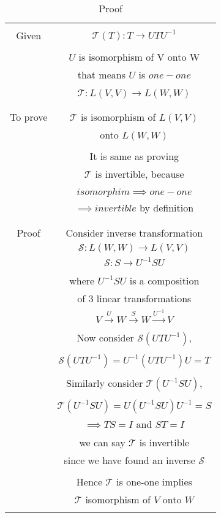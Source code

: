 
\begin{table}[!ht]
\begin{center}
\resizebox{\columnwidth}{!}
{
\begin{tabular}{|c|c|}
\hline
& \\
Given & $\mathcal{T}(T): T \rightarrow UTU^{-1}$\\
& \\
& $U$ is isomorphism of V onto W\\
& that means $U$ is $one-one$\\
& \\
& $\mathcal{T}: L(V,V) \rightarrow L(W,W)$\\
& \\
\hline
&\\
To prove & $\mathcal{T}$ is isomorphism of $L(V,V)$\\
&  onto $L(W,W)$\\
& \\
& It is same as proving\\
& $\mathcal{T}$ is invertible, because \\
& \\
& $isomorphim \implies one-one$\\
& $\implies invertible$ by definition\\
& \\
\hline
& \\
Proof & Consider inverse transformation\\
& $\mathcal{S}: L(W,W) \rightarrow L(V,V)$\\
& $\mathcal{S}: S \rightarrow U^{-1}SU$\\
& \\
& where $U^{-1}SU$ is a composition\\ 
& of 3 linear transformations\\
& $V \xrightarrow{U} W \xrightarrow{S} W \xrightarrow{U^{-1}} V$\\
& \\
& Now consider $\mathcal{S}(UTU^{-1})$,\\
& \\
& $\mathcal{S}(UTU^{-1}) = U^{-1}(UTU^{-1})U = T$\\
& \\
& Similarly consider $\mathcal{T}(U^{-1}SU)$,\\
& \\
& $\mathcal{T}(U^{-1}SU) = U(U^{-1}SU)U^{-1} = S$\\
& \\
& $\implies TS = I \text{ and } ST = I$\\
& \\
& we can say $\mathcal{T}$ is invertible\\
& since we have found an inverse $\mathcal{S}$\\
& \\
& Hence $\mathcal{T}$ is one-one implies \\
& $\mathcal{T}$ isomorphism of $V$ onto $W$\\
&\\
\hline
\end{tabular}
}
\end{center}
\caption{Proof}
\label{table:solutions/3/3/7/2}
\end{table}
